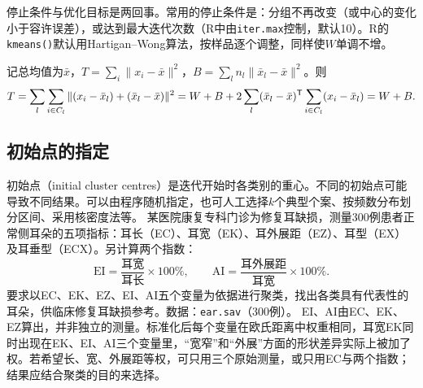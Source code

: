 停止条件与优化目标是两回事。常用的停止条件是：分组不再改变（或中心的变化小于容许误差），或达到最大迭代次数（R中由\texttt{iter.max}控制，默认10）。R的\texttt{kmeans()}默认用Hartigan--Wong算法，按样品逐个调整，同样使$W$单调不增。
\begin{zm}[$T=W+B$]
记总均值为$\bar x$，$T=\sum_i\|x_i-\bar x\|^2$，$B=\sum_ln_l\|\bar x_l-\bar x\|^2$。则
\[
T=\sum_l\sum_{i\in C_l}\|(x_i-\bar x_l)+(\bar x_l-\bar x)\|^2=W+B+2\sum_l(\bar x_l-\bar x)^{\mathsf T}\sum_{i\in C_l}(x_i-\bar x_l)=W+B.
\]
\end{zm}
\subsection{初始点的指定}
初始点（initial cluster centres）是迭代开始时各类别的重心。不同的初始点可能导致不同结果。可以由程序随机指定，也可人工选择$k$个典型个案、按频数分布划分区间、采用核密度法等。
某医院康复专科门诊为修复耳缺损，测量300例患者正常侧耳朵的五项指标：耳长（EC）、耳宽（EK）、耳外展距（EZ）、耳型（EX）及耳垂型（ECX）。另计算两个指数：
\[
\mathrm{EI}=\frac{\text{耳宽}}{\text{耳长}}\times100\%,\qquad
\mathrm{AI}=\frac{\text{耳外展距}}{\text{耳宽}}\times100\%.
\]
要求以EC、EK、EZ、EI、AI五个变量为依据进行聚类，找出各类具有代表性的耳朵，供临床修复耳缺损参考。数据：\texttt{ear.sav}（300例）。
EI、AI由EC、EK、EZ算出，并非独立的测量。标准化后每个变量在欧氏距离中权重相同，耳宽EK同时出现在EK、EI、AI三个变量里，“宽窄”和“外展”方面的形状差异实际上被加了权。若希望长、宽、外展距等权，可只用三个原始测量，或只用EC与两个指数；结果应结合聚类的目的来选择。
